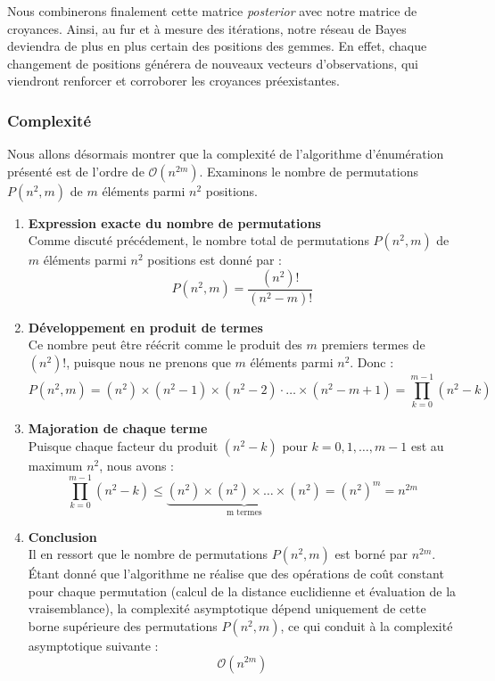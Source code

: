 \documentclass{article}
\begin{document}
\noindent Nous combinerons finalement cette matrice \textit{posterior} avec notre matrice de croyances. Ainsi, au fur et à mesure des itérations, notre réseau de Bayes deviendra de plus en plus certain des positions des gemmes. En effet, chaque changement de positions générera de nouveaux vecteurs d'observations, qui viendront renforcer et corroborer les croyances préexistantes.

\subsubsection{Complexité}\label{subsec:complex}

\noindent Nous allons désormais montrer que la complexité de l'algorithme d'énumération présenté est de l'ordre de \( \mathcal{O}(n^{2m}) \). Examinons le nombre de permutations \( P(n^2, m) \) de \( m \) éléments parmi \( n^2 \) positions.

\vspace{1em}

\begin{enumerate}[left=0pt]

\item \textbf{Expression exacte du nombre de permutations} \\
Comme discuté précédement, le nombre total de permutations \( P(n^2, m) \) de \( m \) éléments parmi \( n^2 \) positions est donné par :
\[
P(n^2, m) = \frac{(n^2)!}{(n^2 - m)!}
\]

\item \textbf{Développement en produit de termes} \\
Ce nombre peut être réécrit comme le produit des \( m \) premiers termes de \( (n^2)! \), puisque nous ne prenons que \( m \) éléments parmi \( n^2 \). Donc :
\[
P(n^2, m) = (n^2) \times (n^2 - 1) \times (n^2 - 2) \cdot \dots \times (n^2 - m + 1) = \prod_{k=0}^{m-1} (n^2 - k)
\]

\item \textbf{Majoration de chaque terme} \\
Puisque chaque facteur du produit \( (n^2 - k) \) pour \( k = 0, 1, \dots, m-1 \) est au maximum \( n^2 \), nous avons :
\[
\prod_{k=0}^{m-1} (n^2 - k) \leq \underset{\text{m termes}}{\underbrace{(n^2) \times (n^2) \times \dots \times (n^2)}}
= (n^2)^m = n^{2m}
\]

\item \textbf{Conclusion} \\
Il en ressort que le nombre de permutations \( P(n^2, m) \) est borné par \( n^{2m} \). Étant donné que l'algorithme ne réalise que des opérations de coût constant pour chaque permutation (calcul de la distance euclidienne et évaluation de la vraisemblance), la complexité asymptotique dépend uniquement de cette borne supérieure des permutations \( P(n^2, m) \), ce qui conduit à la complexité asymptotique suivante :
\[
\mathcal{O}(n^{2m})
\]

\end{enumerate}
\end{document}
